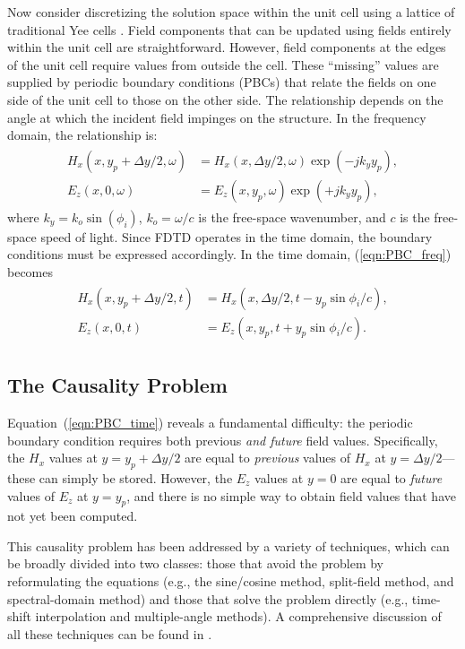 Now consider discretizing the solution space within the unit cell using a lattice of traditional Yee cells \cite{Yee66}.  Field components that can be updated using fields entirely within the unit cell are straightforward.  However, field components at the edges of the unit cell require values from outside the cell.  These ``missing'' values are supplied by periodic boundary conditions (PBCs) that relate the fields on one side of the unit cell to those on the other side.  The relationship depends on the angle at which the incident field impinges on the structure.  In the frequency domain, the relationship is:
\begin{align}
\begin{split}
H_x(x, y_p + \Delta y/2, \omega) &= H_x(x, \Delta y/2, \omega) \exp(-j k_y y_p), \\
E_z(x, 0, \omega) &= E_z(x, y_p, \omega) \exp(+j k_y y_p),
\label{eqn:PBC_freq}
\end{split}
\end{align}
where $k_y = k_o \sin(\phi_i)$, $k_o = \omega/c$ is the free-space wavenumber, and $c$ is the free-space speed of light.  Since FDTD operates in the time domain, the boundary conditions must be expressed accordingly.  In the time domain, (\ref{eqn:PBC_freq}) becomes
\begin{align}
\begin{split}
H_x(x, y_p + \Delta y/2, t) &= H_x(x, \Delta y/2, t - y_p \sin\phi_i / c), \\
E_z(x, 0, t) &= E_z(x, y_p, t + y_p \sin\phi_i / c).
\label{eqn:PBC_time}
\end{split}
\end{align}

\subsection{The Causality Problem}

Equation~(\ref{eqn:PBC_time}) reveals a fundamental difficulty: the periodic boundary condition requires both previous \emph{and future} field values.  Specifically, the $H_x$ values at $y = y_p + \Delta y/2$ are equal to \emph{previous} values of $H_x$ at $y = \Delta y/2$---these can simply be stored.  However, the $E_z$ values at $y = 0$ are equal to \emph{future} values of $E_z$ at $y = y_p$, and there is no simple way to obtain field values that have not yet been computed.

This causality problem has been addressed by a variety of techniques, which can be broadly divided into two classes: those that avoid the problem by reformulating the equations (e.g., the sine/cosine method, split-field method, and spectral-domain method) and those that solve the problem directly (e.g., time-shift interpolation and multiple-angle methods).  A comprehensive discussion of all these techniques can be found in \cite{MaloneyKeslerPBC}.

